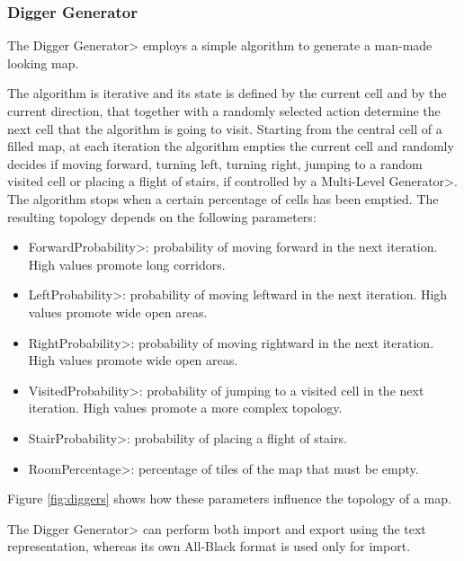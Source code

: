 
\subsubsection{Digger Generator}

The \<Digger Generator> employs a simple algorithm to generate a man-made looking map.

\par

The algorithm is iterative and its state is defined by the current cell and by the current direction, that together with a randomly selected action determine the next cell that the algorithm is going to visit. Starting from the central cell of a filled map, at each iteration the algorithm empties the current cell and randomly decides if moving forward, turning left, turning right, jumping to a random visited cell or placing a flight of stairs, if controlled by a \<Multi-Level Generator>. The algorithm stops when a certain percentage of cells has been emptied. The resulting topology depends on the following parameters:

\begin{itemize}
\item \<ForwardProbability>: probability of moving forward in the next iteration. High values promote long corridors. 
\item \<LeftProbability>: probability of moving leftward in the next iteration. High values promote wide open areas. 
\item \<RightProbability>: probability of moving rightward in the next iteration. High values promote wide open areas. 
\item \<VisitedProbability>: probability of jumping to a visited cell in the next iteration. High values promote a more complex topology. 
\item \<StairProbability>: probability of placing a flight of stairs.
\item \<RoomPercentage>: percentage of tiles of the map that must be empty.
\end{itemize}

\noindent Figure \ref{fig:diggers} shows how these parameters influence the topology of a map.

\par

The \<Digger Generator> can perform both import and export using the text representation, whereas its own All-Black format is used only for import.

